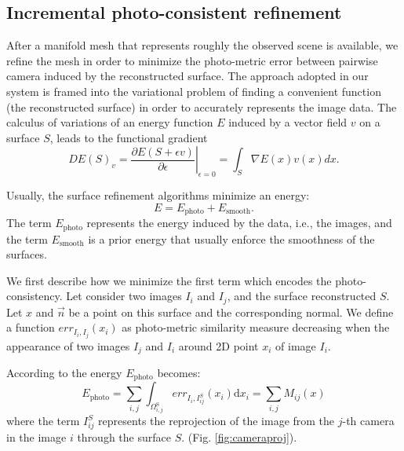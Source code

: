 

\subsection{Incremental photo-consistent refinement}
\label{sec:Incremental_photoconsistent}
After a manifold mesh that represents roughly the observed scene is available, we refine the mesh in order to minimize the photo-metric error between pairwise camera induced by the reconstructed surface. 
The approach adopted in our system is framed into the variational problem of finding a convenient function (the reconstructed surface) in order to  accurately represents the image data.
The calculus of variations of an energy function $E$ induced by a vector field $v$ on a surface $\mathit{S}$, leads to the functional gradient
\begin{equation}
\label{eq::calculus}
 DE(\mathit{S})_v = \left.\frac{\partial E(\mathit{S} + \epsilon v)}{\partial \epsilon} \right|_{\epsilon=0} = \int_{\mathit{S}} \nabla E(x)v(x) dx.
\end{equation}

Usually, the surface refinement algorithms minimize an energy:
\begin{equation}
E = E_{\textrm{photo}} + E_{\textrm{smooth}} .
\end{equation}
The term $E_{\textrm{photo}}$ represents the energy induced by the data, i.e., the images, and the term $E_{\textrm{smooth}}$ is a prior energy that usually enforce the smoothness of the surfaces. 


We first describe how we minimize the first term which encodes the photo-consistency.
Let consider two images $I_i$ and $I_j$, and the surface reconstructed $\mathit{S}$. Let $x$ and $\overrightarrow{n}$ be a point on this surface and the corresponding normal. We define a function $err_{I_i, I_j}(x_i)$ as photo-metric similarity measure decreasing when the appearance of two images $I_j$ and $I_i$ around 2D point $x_i$ of image $I_i$.

According to \cite{pons2007multi} the energy $E_{\textrm{photo}}$ becomes:
\begin{equation}
\label{eq:energy_photo}
  E_{\textrm{photo}} = \sum_{i,j}\int_{\Omega^{\textrm{S}}_{i,j}} err_{I_i, I_{ij}^{\mathit{S}}}(x_i)\textrm{d}x_i = \sum_{i,j} \mathit{M}_{ij}(x)
\end{equation}
where the term $I_{ij}^{\mathit{S}}$ represents the reprojection of the image from the $j$-th camera in the image $i$ through the surface $\mathit{S}$.
(Fig. \ref{fig:cameraproj}).

